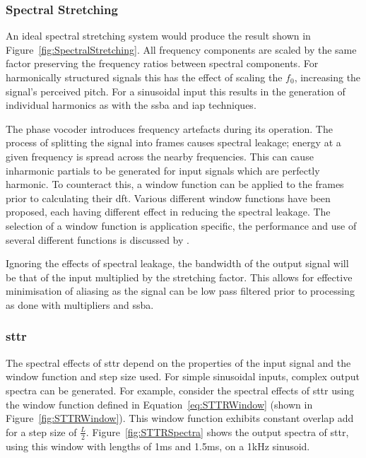 		\subsubsection*{Spectral Stretching}
			An ideal spectral stretching system would produce the result shown in
			Figure~\ref{fig:SpectralStretching}. All frequency components are scaled by the same factor
			preserving the frequency ratios between spectral components. For harmonically structured signals
			this has the effect of scaling the $f_{0}$, increasing the signal's perceived pitch. For a
			sinusoidal input this results in the generation of individual harmonics as with the \acrshort{ssba}
			and \acrshort{iap} techniques.
			
			The phase vocoder introduces frequency artefacts during its operation. The process of splitting the
			signal into frames causes spectral leakage; energy at a given frequency is spread across the nearby
			frequencies. This can cause inharmonic partials to be generated for input signals which are
			perfectly harmonic. To counteract this, a window function can be applied to the frames prior to
			calculating their \acrshort{dft}. Various different window functions have been proposed, each
			having different effect in reducing the spectral leakage. The selection of a window function is
			application specific, the performance and use of several different functions is discussed by
			\citet{harris1978on}.
			
			Ignoring the effects of spectral leakage, the bandwidth of the output signal will be that of the
			input multiplied by the stretching factor. This allows for effective minimisation of aliasing as
			the signal can be low pass filtered prior to processing as done with multipliers and
			\acrshort{ssba}.
		
		\subsubsection*{\acrshort{sttr}}
			The spectral effects of \acrshort{sttr} depend on the properties of the input signal and the
			window function and step size used. For simple sinusoidal inputs, complex output spectra can be
			generated. For example, consider the spectral effects of \acrshort{sttr} using the window function
			defined in Equation~\ref{eq:STTRWindow} (shown in Figure~\ref{fig:STTRWindow}). This window
			function exhibits constant overlap add for a step size of $\frac{L}{2}$.
			Figure~\ref{fig:STTRSpectra} shows the output spectra of \acrshort{sttr}, using this window with
			lengths of 1ms and 1.5ms, on a 1kHz sinusoid.

